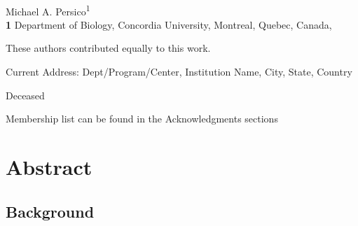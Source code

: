 \documentclass[
  10pt,
  letterpaper,
]{article}
\begin{document}
\vspace*{0.2in}

\begin{flushleft}
{\Large
\textbf{} %
}
\newline
\\
Michael A. Persico\textsuperscript{1}
\\
\bigskip
\textbf{1} Department of Biology, Concordia
University, Montreal, Quebec, Canada, 
\bigskip

% 
%
\Yinyang These authors contributed equally to this work.


\textcurrency Current Address: Dept/Program/Center, Institution Name, City, State, Country %

\dag Deceased

\textpilcrow Membership list can be found in the Acknowledgments
sections


\end{flushleft}

\section*{Abstract}
\hypertarget{background}{%
\subsection{Background}\label{background}}
\end{document}
